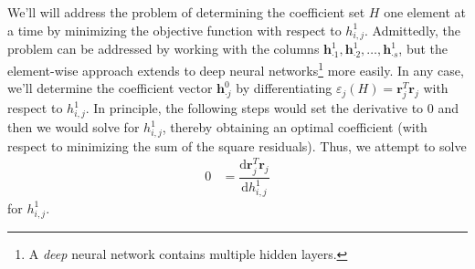 \documentclass[graybox,envcountchap]{svmono}
\newcommand{\hf}{\mathbf{h}}
\newcommand{\nn}{neural network}
\begin{document}
We'll will address the problem of determining the coefficient set $H$ one element at a time by minimizing the objective function with respect to $h^1_{i,j}$.    
Admittedly, the problem can be addressed by working with the columns $\hf^1_{\cdot 1}, \hf^1_{\cdot 2}, \ldots, \hf^1_{\cdot s}$, but the element-wise approach extends to deep \nn s\footnote{A \emph{deep} {\nn } contains multiple hidden layers.} more easily.  
In any case, we'll determine the coefficient vector $\hf^0_{\cdot j}$ by differentiating $\varepsilon_j(H) = \mathbf{r}_j^T\mathbf{r}_j$ with respect to $h^1_{i, j}$. In principle, the following steps would set the derivative to 0 and then we would solve for $h^1_{i, j}$, thereby obtaining an optimal coefficient (with respect to minimizing the sum of the square residuals). Thus, we attempt to solve
\begin{equation}\label{eq:errors}
 \begin{align}
  0 &=  \dfrac{\text{d}\mathbf{r}_j^T\mathbf{r}_j}{\text{d} h^1_{i,j}} 
  \end{align}
 \end{equation}
for $ h^1_{i,j}$.
\end{document}
